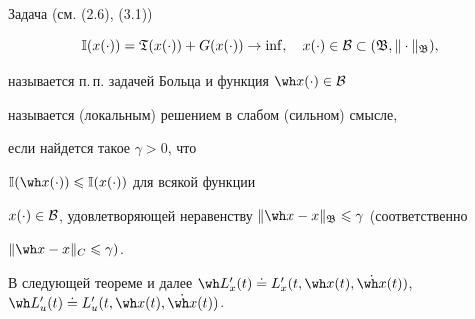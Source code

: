 \begin{defns}


Задача (см. (2.6), (3.1))


\begin{equation}


\Bbb I(x(\cdot))=\frak T(x(\cdot))+G(x(\cdot))\to\inf,


\quad x(\cdot)\in\cal B\subset(\frak B,\|\cdot\|_{\frak B}),


\end{equation}


называется п.\,п. задачей Больца и функция $\wh x(\cdot)\in\cal B$


называется (локальным) решением в слабом (сильном) смысле,


если найдется такое $\gamma>0$, что


$\Bbb I(\wh x(\cdot))\leqslant\Bbb I(x(\cdot))$ для всякой функции


$x(\cdot)\in\cal B$, удовлетворяющей неравенству $\|\wh


x-x\|_{\frak B}\leqslant\gamma$ (соответственно


$\|\wh x-x\|_C\leqslant\gamma)$.


\end{defns}





В следующей теореме и далее $\wh L'_x(t)\doteq L'_x(t,\wh x(t),


\Dot{\wh x}(t))$, $\wh L'_u(t)\doteq


L'_u(t,\wh x(t),\Dot{\wh x}(t))$.






